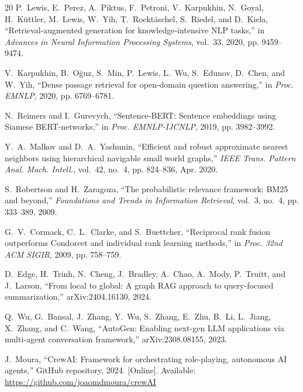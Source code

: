 \documentclass[conference]{IEEEtran}
\begin{document}
\begin{thebibliography}{20}
P.~Lewis, E.~Perez, A.~Piktus, F.~Petroni, V.~Karpukhin, N.~Goyal, H.~K\"uttler, M.~Lewis, W.~Yih, T.~Rockt\"aschel, S.~Riedel, and D.~Kiela, ``Retrieval-augmented generation for knowledge-intensive NLP tasks,'' in \textit{Advances in Neural Information Processing Systems}, vol.~33, 2020, pp. 9459--9474.

V.~Karpukhin, B.~O\u{g}uz, S.~Min, P.~Lewis, L.~Wu, S.~Edunov, D.~Chen, and W.~Yih, ``Dense passage retrieval for open-domain question answering,'' in \textit{Proc. EMNLP}, 2020, pp. 6769--6781.

N.~Reimers and I.~Gurevych, ``Sentence-BERT: Sentence embeddings using Siamese BERT-networks,'' in \textit{Proc. EMNLP-IJCNLP}, 2019, pp. 3982--3992.

Y.~A.~Malkov and D.~A.~Yashunin, ``Efficient and robust approximate nearest neighbors using hierarchical navigable small world graphs,'' \textit{IEEE Trans. Pattern Anal. Mach. Intell.}, vol.~42, no.~4, pp. 824--836, Apr. 2020.

S.~Robertson and H.~Zaragoza, ``The probabilistic relevance framework: BM25 and beyond,'' \textit{Foundations and Trends in Information Retrieval}, vol.~3, no.~4, pp. 333--389, 2009.

G.~V.~Cormack, C.~L.~Clarke, and S.~Buettcher, ``Reciprocal rank fusion outperforms Condorcet and individual rank learning methods,'' in \textit{Proc. 32nd ACM SIGIR}, 2009, pp. 758--759.

D.~Edge, H.~Trinh, N.~Cheng, J.~Bradley, A.~Chao, A.~Mody, P.~Truitt, and J.~Larson, ``From local to global: A graph RAG approach to query-focused summarization,'' arXiv:2404.16130, 2024.

Q.~Wu, G.~Bansal, J.~Zhang, Y.~Wu, S.~Zhang, E.~Zhu, B.~Li, L.~Jiang, X.~Zhang, and C.~Wang, ``AutoGen: Enabling next-gen LLM applications via multi-agent conversation framework,'' arXiv:2308.08155, 2023.

J.~Moura, ``CrewAI: Framework for orchestrating role-playing, autonomous AI agents,'' GitHub repository, 2024. [Online]. Available: \url{https://github.com/joaomdmoura/crewAI}


\end{thebibliography}
\end{document}

